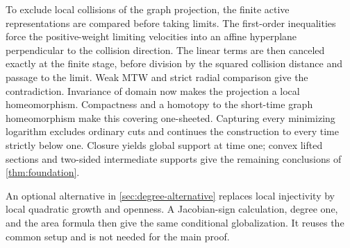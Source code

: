 To exclude local collisions of the graph projection, the finite active
representations are compared before taking limits. The first-order inequalities force the positive-weight limiting velocities
into an affine hyperplane perpendicular to the collision direction.
The linear terms are then canceled exactly at the finite stage,
before division by the squared collision distance and passage to the limit.
Weak MTW and strict radial comparison give the contradiction.
Invariance of domain now makes the projection a local homeomorphism.
Compactness and a homotopy to the short-time graph homeomorphism make
this covering one-sheeted. Capturing every minimizing logarithm
excludes ordinary cuts and continues the construction to every time
strictly below one. Closure yields global support at time one; convex
lifted sections and two-sided intermediate supports give the remaining
conclusions of \cref{thm:foundation}.

An optional alternative in \cref{sec:degree-alternative} replaces local
injectivity by local quadratic growth and openness. A Jacobian-sign
calculation, degree one, and the area formula then give the same
conditional globalization. It reuses the common setup and is not
needed for the main proof.

